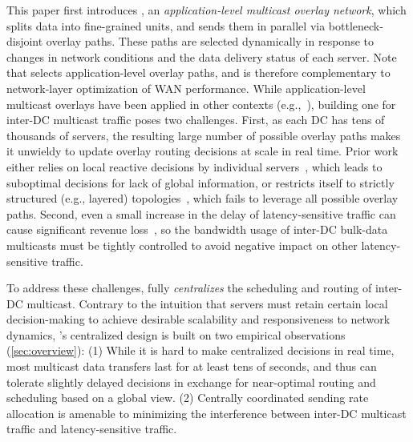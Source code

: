 This paper first introduces {\em \name}, an {\em application-level multicast
overlay network}, which splits data into fine-grained units, and
sends them in parallel via bottleneck-disjoint overlay paths. These
paths are selected dynamically in response to changes in network
conditions and the data delivery status of each server. Note that
\name selects application-level overlay paths, and is therefore
complementary to network-layer optimization of WAN performance.
While application-level multicast overlays have been applied in other
contexts (e.g.,~\cite{Liebeherr2002Application,Wang2007mTreebone,
Andreev2013Designing,Mokhtarian2015Minimum}), building one for
inter-DC multicast traffic poses two challenges. First, as each DC
has tens of thousands of servers, the resulting large number of
possible overlay paths makes it unwieldy to update overlay routing
decisions at scale in real time. Prior work either relies on local
reactive decisions by individual servers~\cite{kostic2003bullet,
Repantis2010Scaling,Huang2014A}, which leads to suboptimal decisions
for lack of global information, or restricts itself to strictly
structured (e.g., layered) topologies~\cite{Nygren2010The}, which
fails to leverage all possible overlay paths. Second, even a small
increase in the delay of latency-sensitive traffic can cause
significant revenue loss~\cite{zhang2017communication}, so the bandwidth usage of inter-DC
bulk-data multicasts must be tightly controlled to avoid negative
impact on other latency-sensitive traffic.

To address these challenges, \name fully {\em centralizes} the
scheduling and routing of inter-DC multicast. Contrary to the
intuition that servers must retain certain local decision-making to
achieve desirable scalability and responsiveness to network dynamics,
\name's centralized design is built on two empirical observations
(\Section\ref{sec:overview}):
(1) While it is hard to make centralized decisions in real time, most
multicast data transfers last for at least tens of seconds, and thus
can tolerate slightly delayed decisions in exchange for near-optimal
routing and scheduling based on a global view.
(2) Centrally coordinated sending rate allocation is amenable to
minimizing the interference between inter-DC multicast traffic and
latency-sensitive traffic.

